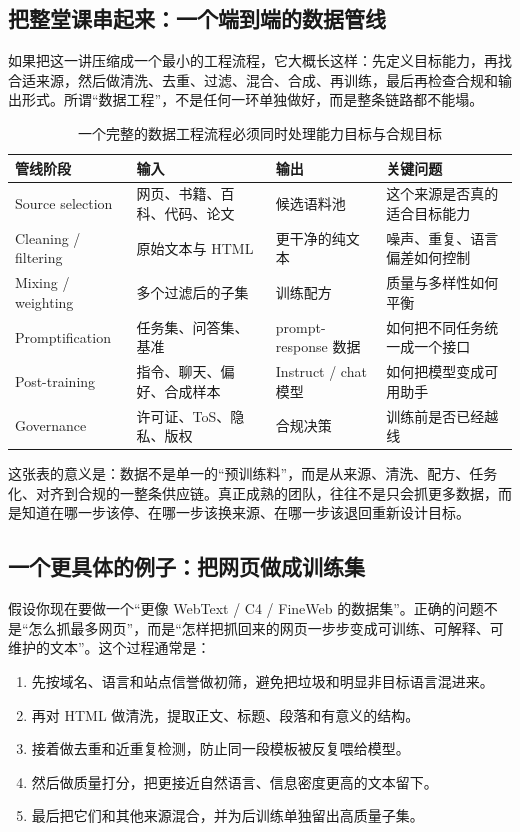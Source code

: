 \documentclass[a4paper]{article}
\begin{document}
\subsection{把整堂课串起来：一个端到端的数据管线}

如果把这一讲压缩成一个最小的工程流程，它大概长这样：先定义目标能力，再找合适来源，然后做清洗、去重、过滤、混合、合成、再训练，最后再检查合规和输出形式。所谓“数据工程”，不是任何一环单独做好，而是整条链路都不能塌。

\begin{table}[H]
\centering
\begin{tabular}{p{}p{}p{}p{}}
\toprule
\textbf{管线阶段} & \textbf{输入} & \textbf{输出} & \textbf{关键问题} \\
\midrule
Source selection & 网页、书籍、百科、代码、论文 & 候选语料池 & 这个来源是否真的适合目标能力 \\
Cleaning / filtering & 原始文本与 HTML & 更干净的纯文本 & 噪声、重复、语言偏差如何控制 \\
Mixing / weighting & 多个过滤后的子集 & 训练配方 & 质量与多样性如何平衡 \\
Promptification & 任务集、问答集、基准 & prompt-response 数据 & 如何把不同任务统一成一个接口 \\
Post-training & 指令、聊天、偏好、合成样本 & Instruct / chat 模型 & 如何把模型变成可用助手 \\
Governance & 许可证、ToS、隐私、版权 & 合规决策 & 训练前是否已经越线 \\
\bottomrule
\end{tabular}
\caption{一个完整的数据工程流程必须同时处理能力目标与合规目标}
\end{table}

这张表的意义是：数据不是单一的“预训练料”，而是从来源、清洗、配方、任务化、对齐到合规的一整条供应链。真正成熟的团队，往往不是只会抓更多数据，而是知道在哪一步该停、在哪一步该换来源、在哪一步该退回重新设计目标。

\subsection{一个更具体的例子：把网页做成训练集}

假设你现在要做一个“更像 WebText / C4 / FineWeb 的数据集”。正确的问题不是“怎么抓最多网页”，而是“怎样把抓回来的网页一步步变成可训练、可解释、可维护的文本”。这个过程通常是：
\begin{enumerate}
    \item 先按域名、语言和站点信誉做初筛，避免把垃圾和明显非目标语言混进来。
    \item 再对 HTML 做清洗，提取正文、标题、段落和有意义的结构。
    \item 接着做去重和近重复检测，防止同一段模板被反复喂给模型。
    \item 然后做质量打分，把更接近自然语言、信息密度更高的文本留下。
    \item 最后把它们和其他来源混合，并为后训练单独留出高质量子集。
\end{enumerate}
\end{document}

